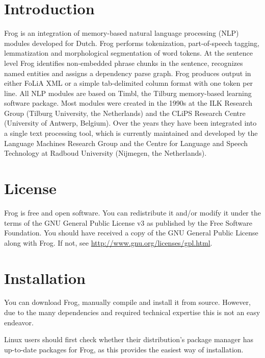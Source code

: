 \documentclass{book}
\begin{document}


\chapter{Introduction}

Frog is an integration of memory-based natural language processing (NLP)
modules developed for Dutch. Frog performs tokenization, part-of-speech tagging,
lemmatization and morphological segmentation of word tokens. At the sentence
level Frog identifies non-embedded phrase chunks in the sentence, recognizes named
entities and assigns a dependency parse graph. Frog produces output in either FoLiA XML
or a simple tab-delimited column format with one token per line. All
NLP modules are based on Timbl, the Tilburg memory-based learning software
package. Most modules were created in the 1990s at the ILK Research Group
(Tilburg University, the Netherlands) and the CLiPS Research Centre (University
of Antwerp, Belgium). Over the years they have been integrated into a single
text processing tool, which is currently maintained and developed by the
Language Machines Research Group and the Centre for Language and Speech
Technology at Radboud University (Nijmegen, the Netherlands).

\chapter{License}

Frog is free and open software. You can redistribute it and/or modify it under
the terms of the GNU General Public License v3 as published by the Free Software
Foundation.  You should have received a copy of the GNU General Public License
along with Frog. If not, see \url{http://www.gnu.org/licenses/gpl.html}.

\chapter{Installation}

You can download Frog, manually compile and install it from source.  However,
due to the many dependencies and required technical expertise this is not an
easy endeavor.

Linux users should first check whether their distribution's package manager has
up-to-date packages for Frog, as this provides the easiest way of installation.
\end{document}
